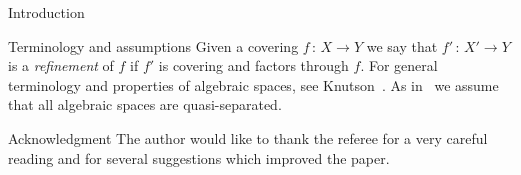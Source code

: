 \documentclass[a4paper,twoside,11pt]{amsart}[2009/07/02] %
\newcommand{\map}[3]{#1\,:\, #2\rightarrow #3}
\begin{document}
\begin{section}{Introduction}
\begin{subsection}{Terminology and assumptions}
Given a covering $\map{f}{X}{Y}$ we say that $\map{f'}{X'}{Y}$ is a
\emph{refinement} of $f$ if
$f'$ is covering and factors through $f$.
%
For general terminology and properties of algebraic
spaces, see Knutson~\cite{knutson_alg_spaces}. As in~\cite{knutson_alg_spaces}
we assume that all algebraic spaces are quasi-separated.
\end{subsection}

\begin{subsection}{Acknowledgment}
The author would like to thank the referee for a very careful reading and
for several suggestions which improved the paper.
\end{subsection}

\end{section}
\setcounter{secnumdepth}{3}

\end{document}
